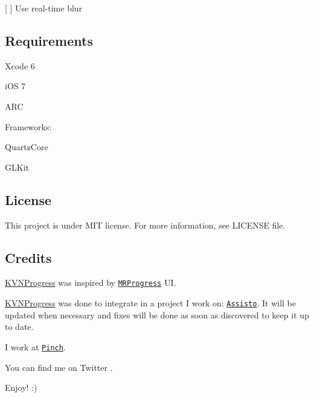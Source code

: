 \begin{DoxyItemize}
\item \mbox{[} \mbox{]} Use real-\/time blur
\end{DoxyItemize}

\subsection*{Requirements}


\begin{DoxyItemize}
\item Xcode 6
\item i\+OS 7
\item A\+RC
\item Frameworks\+:
\begin{DoxyItemize}
\item Quartz\+Core
\item G\+L\+Kit
\end{DoxyItemize}
\end{DoxyItemize}

\subsection*{License}

This project is under M\+IT license. For more information, see {\ttfamily L\+I\+C\+E\+N\+SE} file.

\subsection*{Credits}

\mbox{\hyperlink{interface_k_v_n_progress}{K\+V\+N\+Progress}} was inspired by \href{https://github.com/mrackwitz/MRProgress}{\tt M\+R\+Progress} UI.

\mbox{\hyperlink{interface_k_v_n_progress}{K\+V\+N\+Progress}} was done to integrate in a project I work on\+: \href{https://assis.to}{\tt Assisto}. It will be updated when necessary and fixes will be done as soon as discovered to keep it up to date.

I work at \href{http://pinchproject.com}{\tt Pinch}.

You can find me on Twitter \href{https://twitter.com/kevinh6113}{\tt }.

Enjoy! \+:) 